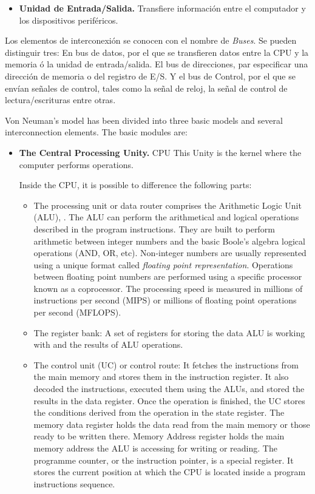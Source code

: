 \begin{paracol}{2}
\begin{itemize}
\item \textbf{Unidad de Entrada/Salida.} Transfiere información entre el computador y los dispositivos periféricos.
\end{itemize}

Los elementos de interconexión se conocen con el nombre de \emph{Buses}. Se pueden distinguir tres: En bus de datos, por el que se transfieren datos entre la CPU y la memoria ó la unidad de entrada/salida. El bus de direcciones, par especificar una dirección de memoria o del registro de E/S. Y el bus de Control, por el que se envían señales de control, tales como la señal de reloj, la señal de control de lectura/escrituras entre otras.

\switchcolumn
Von Neuman's model has been divided into three basic models and several interconnection elements. The basic modules are: 

\begin{itemize}
\item \textbf{The Central Processing Unity.} CPU  This Unity is the kernel where the computer performs operations. 

Inside the CPU, it is possible to difference the following parts:

\begin{itemize}

\item The processing unit or data router comprises the Arithmetic Logic Unit (ALU), . The ALU can perform the arithmetical and logical operations described in the program instructions. They are built to perform arithmetic between integer numbers and the basic Boole's algebra logical operations (AND, OR, etc). Non-integer numbers are usually represented using a unique format called \emph{floating point representation}. Operations between floating point numbers are performed using a specific processor known as a coprocessor. The processing speed is measured in millions of instructions per second (MIPS) or millions of floating point operations per second (MFLOPS).

\item The register bank: A set of registers for storing the data ALU is working with and the results of ALU operations.
 
\item The control unit (UC) or control route: It fetches the instructions from the main memory and stores them in the instruction register. It also decoded the instructions, executed them using the ALUs, and stored the results in the data register. Once the operation is finished, the UC stores the conditions derived from the operation in the state register. The memory data register holds the data read from the main memory or those ready to be written there. Memory Address register holds the main memory address the ALU is accessing for writing or reading. The programme counter, or the instruction pointer, is a special register. It stores the current position at which the CPU is located inside a program instructions sequence.    
\end{itemize}
 


\end{itemize}
\end{paracol}
